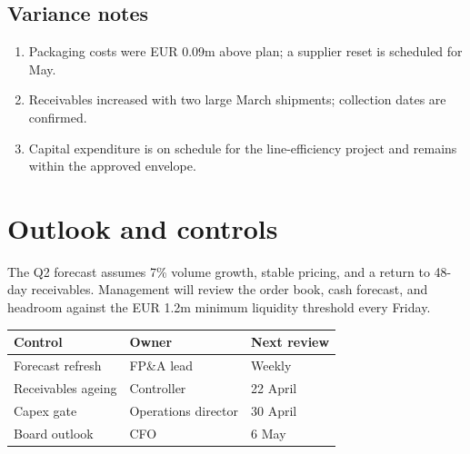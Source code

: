 \documentclass[11pt,a4paper]{report}
\begin{document}
\section{Variance notes}
\begin{enumerate}[leftmargin=*]\item Packaging costs were EUR 0.09m above plan; a supplier reset is scheduled for May.\item Receivables increased with two large March shipments; collection dates are confirmed.\item Capital expenditure is on schedule for the line-efficiency project and remains within the approved envelope.\end{enumerate}
\chapter{Outlook and controls}
The Q2 forecast assumes 7\% volume growth, stable pricing, and a return to 48-day receivables. Management will review the order book, cash forecast, and headroom against the EUR 1.2m minimum liquidity threshold every Friday.
\begin{longtable}{@{}P{0.29\textwidth}P{0.31\textwidth}P{0.27\textwidth}@{}}\toprule Control & Owner & Next review\\\midrule
Forecast refresh & FP\&A lead & Weekly\\
Receivables ageing & Controller & 22 April\\
Capex gate & Operations director & 30 April\\
Board outlook & CFO & 6 May\\\bottomrule\end{longtable}
\end{document}
